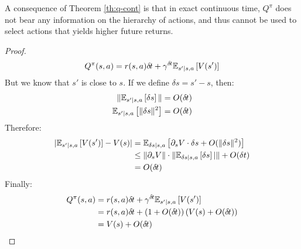 A consequence of Theorem \ref{th:q-cont} is that in exact continuous time,
$Q^\pi$ does not bear any information on the hierarchy of actions, and
thus cannot be used to select actions that yields higher future returns.

\begin{proof}
  \begin{align}
    Q^\pi(s, a) &= r(s, a){\delta\hspace{-.1em}t} + \gamma^{\delta\hspace{-.1em}t} \mathbb{E}_{s'|s, a}\left[V(s')\right] \\
  \end{align}
  But we know that $s'$ is close to $s$. If we define $\delta s = s' - s$, then:
  \begin{align}
    \|\mathbb{E}_{s'|s, a}\left[\delta s\right]\| &= O({\delta\hspace{-.1em}t}) \\
    \mathbb{E}_{s'|s, a}\left[\|\delta s\|^2\right] &= O({\delta\hspace{-.1em}t})
  \end{align}
   Therefore:
  \begin{align}
    |\mathbb{E}_{s'|s, a}\left[V(s')\right] - V(s)| &= \mathbb{E}_{\delta s|s, a}\left[\partial_s V\cdot \delta s +O(\|\delta s\|^2)\right]\\
                                            &\leq \|\partial_s V\|\cdot \|\mathbb{E}_{\delta s|s, a}\left[\delta s\right]|\| +O(\delta t)\\
    &= O({\delta\hspace{-.1em}t})
  \end{align}
  Finally:
  \begin{align}
    Q^\pi(s, a) &= r(s, a){\delta\hspace{-.1em}t} + \gamma^{\delta\hspace{-.1em}t} \mathbb{E}_{s'|s, a}\left[V(s')\right] \\
                &= r(s, a){\delta\hspace{-.1em}t} + \left(1 + O({\delta\hspace{-.1em}t})\right)(V(s) + O({\delta\hspace{-.1em}t}))\\
    &= V(s) + O({\delta\hspace{-.1em}t})
  \end{align}
  \end{proof}
